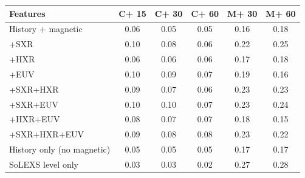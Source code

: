 \begin{tabular}{lccccc}
\toprule
Features & C+ 15 & C+ 30 & C+ 60 & M+ 30 & M+ 60 \\
\midrule
History + magnetic & 0.06 & 0.05 & 0.05 & 0.16 & 0.18 \\
+SXR & 0.10 & 0.08 & 0.06 & 0.22 & 0.25 \\
+HXR & 0.06 & 0.06 & 0.06 & 0.17 & 0.18 \\
+EUV & 0.10 & 0.09 & 0.07 & 0.19 & 0.16 \\
+SXR+HXR & 0.09 & 0.07 & 0.06 & 0.23 & 0.23 \\
+SXR+EUV & 0.10 & 0.10 & 0.07 & 0.23 & 0.24 \\
+HXR+EUV & 0.08 & 0.07 & 0.07 & 0.18 & 0.15 \\
+SXR+HXR+EUV & 0.09 & 0.08 & 0.08 & 0.23 & 0.22 \\
History only (no magnetic) & 0.05 & 0.05 & 0.05 & 0.17 & 0.17 \\
\midrule
SoLEXS level only & 0.03 & 0.03 & 0.02 & 0.27 & 0.28 \\
\bottomrule
\end{tabular}
